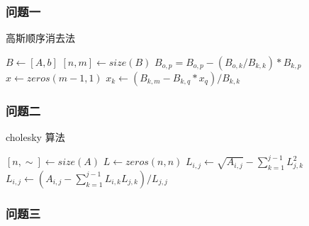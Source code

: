 \subsubsection{问题一}

\begin{breakablealgorithm}
    \caption{高斯顺序消去法}
    \begin{algorithmic}[1]
        \STATE $B \leftarrow [A, b]$ 
        \STATE $[n, m] \leftarrow size(B)$ 
        \STATE $B_{o, p} = B_{o, p} - (B_{o, k} / B_{k, k}) * B_{k, p}$
        \ENDFOR
        \ENDFOR
        \ENDFOR
        \STATE $x \leftarrow zeros(m-1, 1)$ 
        \STATE $x_k \leftarrow (B_{k, m} - B_{k, q} * x_q ) / B_{k, k}$
        \ENDFOR
        \ENDFOR
    \end{algorithmic}
\end{breakablealgorithm}

\subsubsection{问题二}

\begin{breakablealgorithm}
    \caption{cholesky 算法}
    \begin{algorithmic}[1]
        \STATE $[n, \sim] \leftarrow size(A)$ 
        \STATE $L \leftarrow zeros(n, n)$ 
        \STATE $L_{i, j} \leftarrow \sqrt{A_{i, j}} - \sum_{k=1}^{j-1}L_{j, k}^2$
        \ELSE
        \STATE $L_{i, j} \leftarrow (A_{i, j} - \sum_{k=1}^{j-1}L_{i, k}L_{j, k}) / L_{j, j}$
        \ENDIF
        \ENDFOR
        \ENDFOR
    \end{algorithmic}
\end{breakablealgorithm}

\subsubsection{问题三}

